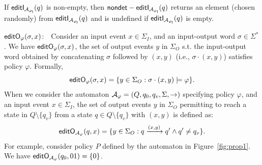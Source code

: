%
%
%
If $\mathsf{editI_{{\cal A}_{\varphi_I}}}(q)$ is non-empty, then $\mathsf{{nondet}-editI_{{\cal A}_{\varphi_{I}}}}(q)$ returns an element (chosen randomly) from $\mathsf{editI_{{\cal A}_{\varphi_I}}}(q)$ and is undefined if $\mathsf{editI_{{\cal A}_{\varphi_I}}}(q)$ is empty.
%
\item {\boldmath$\mathsf{editO_{\varphi}}(\sigma, x)$}:~~Consider an input event $x\in\Sigma_I$, and an input-output word $\sigma\in\Sigma^*$. We have $\mathsf{editO_{\varphi}}(\sigma, x)$, the set of output events $y$ in $\Sigma_O$ s.t. the input-output word obtained by concatenating $\sigma$ followed by $(x,y)$ (i.e., $\sigma\cdot (x,y)$) satisfies policy $\varphi$. Formally,
\[\mathsf{editO_{\varphi}}(\sigma,x) = \{y \in \Sigma_O: \sigma \cdot (x,y) \models \varphi \}.\]
%
When we consider the automaton ${\cal A}_{\varphi}=(Q, q_0, q_v, \Sigma, \rightarrow)$ specifying policy $\varphi$, and an input event $x\in\Sigma_I$,
the set of output events $y$ in $\Sigma_O$ permitting to reach a state in $Q\setminus \{q_v\}$ from a state $q\in Q\setminus \{q_v\}$ with $(x,y)$ is defined as:
\[\mathsf{editO_{{\cal A}_\varphi}}(q,x) = \{y \in \Sigma_O: q \xrightarrow{(x,y)} q' \wedge q' \neq q_v \}. \]
\noindent
%
For example, consider policy $P$ defined by the automaton in Figure~\ref{fig:prop1}.
We have $\mathsf{editO_{{\cal A}_\varphi}}(q_0, 01) = \{0\}$.

